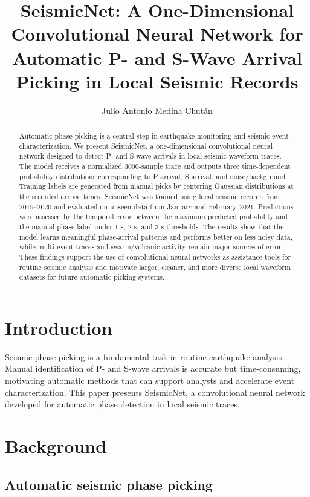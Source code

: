 \documentclass[11pt]{article}
\title{SeismicNet: A One-Dimensional Convolutional Neural Network for Automatic P- and S-Wave Arrival Picking in Local Seismic Records}
\author{Julio Antonio Medina Chut\'{a}n}
\affil{Escuela de Ciencias F\'{i}sicas y Matem\'{a}ticas, Universidad de San Carlos de Guatemala}
\date{}
\begin{document}
\maketitle

\begin{abstract}
Automatic phase picking is a central step in earthquake monitoring and seismic event characterization. We present SeismicNet, a one-dimensional convolutional neural network designed to detect P- and S-wave arrivals in local seismic waveform traces. The model receives a normalized 3000-sample trace and outputs three time-dependent probability distributions corresponding to P arrival, S arrival, and noise/background. Training labels are generated from manual picks by centering Gaussian distributions at the recorded arrival times. SeismicNet was trained using local seismic records from 2019--2020 and evaluated on unseen data from January and February 2021. Predictions were assessed by the temporal error between the maximum predicted probability and the manual phase label under 1 s, 2 s, and 3 s thresholds. The results show that the model learns meaningful phase-arrival patterns and performs better on less noisy data, while multi-event traces and swarm/volcanic activity remain major sources of error. These findings support the use of convolutional neural networks as assistance tools for routine seismic analysis and motivate larger, cleaner, and more diverse local waveform datasets for future automatic picking systems.
\end{abstract}

\section{Introduction}
Seismic phase picking is a fundamental task in routine earthquake analysis. Manual identification of P- and S-wave arrivals is accurate but time-consuming, motivating automatic methods that can support analysts and accelerate event characterization. This paper presents SeismicNet, a convolutional neural network developed for automatic phase detection in local seismic traces.

\section{Background}
\subsection{Automatic seismic phase picking}
\end{document}
